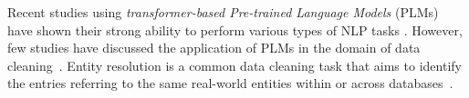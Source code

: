 Recent studies using \emph{transformer-based Pre-trained Language Models} (PLMs) have shown their strong ability to perform various types of NLP tasks \cite{min_recent_2021}. However, few studies have discussed the application of PLMs in the domain of data cleaning~\cite{li_deep_2020,narayan_can_2022,vos2022towards}.  
Entity resolution is a common data cleaning task that aims to identify the entries referring to the same real-world entities within or across databases~\cite{christen_data_2012}. 







